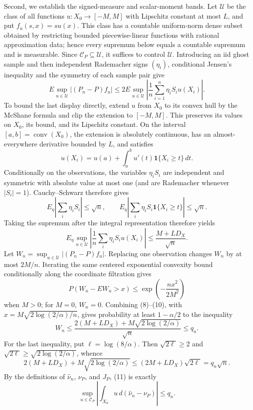 Second, we establish the signed-measure and scalar-moment bands.  Let \(\mathcal U\) be the class of all functions \(u:X_0\to[-M,M]\) with Lipschitz constant at most \(L\), and put \(f_u(s,x)=su(x)\).  This class has a countable uniform-norm dense subset obtained by restricting bounded piecewise-linear functions with rational approximation data; hence every supremum below equals a countable supremum and is measurable.  Since \(\mathcal C_P\subseteq\mathcal U\), it suffices to control \(\mathcal U\).  Introducing an iid ghost sample and then independent Rademacher signs \((\eta_i)\), conditional Jensen's inequality and the symmetry of each sample pair give
\[
 E\sup_{u\in\mathcal U}|(P_n-P)f_u|
 \le 2E\sup_{u\in\mathcal U}
 \left|\frac1n\sum_{i=1}^n\eta_iS_i u(X_i)\right|.                             \tag{8}
\]
To bound the last display directly, extend \(u\) from \(X_0\) to its convex hull by the McShane formula and clip the extension to \([-M,M]\).  This preserves its values on \(X_0\), its bound, and its Lipschitz constant.  On the interval \([a,b]=\operatorname{conv}(X_0)\), the extension is absolutely continuous, has an almost-everywhere derivative bounded by \(L\), and satisfies
\[
 u(X_i)=u(a)+\int_a^b u'(t)\mathbf 1\{X_i\ge t\}\,dt.
\]
Conditionally on the observations, the variables \(\eta_iS_i\) are independent and symmetric with absolute value at most one (and are Rademacher whenever \(|S_i|=1\)).  Cauchy--Schwarz therefore gives
\[
 E_\eta\left|\sum_i\eta_iS_i\right|\le\sqrt n,
 \qquad
 E_\eta\left|\sum_i\eta_iS_i\mathbf 1\{X_i\ge t\}\right|\le\sqrt n.
\]
Taking the supremum after the integral representation therefore yields
\[
 E_\eta\sup_{u\in\mathcal U}
 \left|\frac1n\sum_i\eta_iS_i u(X_i)\right|
 \le \frac{M+LD_X}{\sqrt n}.                                                     \tag{9}
\]
Let \(W_n=\sup_{u\in\mathcal U}|(P_n-P)f_u|\).  Replacing one observation changes \(W_n\) by at most \(2M/n\).  Iterating the same centered exponential convexity bound conditionally along the coordinate filtration gives
\[
 P(W_n-EW_n>x)\le \exp\!\left(-\frac{nx^2}{2M^2}\right)                        \tag{10}
\]
when \(M>0\); for \(M=0\), \(W_n=0\).  Combining (8)--(10), with \(x=M\sqrt{2\log(2/\alpha)/n}\), gives probability at least \(1-\alpha/2\) to the inequality
\[
 W_n\le \frac{2(M+LD_X)+M\sqrt{2\log(2/\alpha)}}{\sqrt n}\le q_n.             \tag{11}
\]
For the last inequality, put \(\ell=\log(8/\alpha)\).  Then \(\sqrt{2\ell}\ge2\) and \(\sqrt{2\ell}\ge\sqrt{2\log(2/\alpha)}\), whence
\[
 2(M+LD_X)+M\sqrt{2\log(2/\alpha)}
 \le (2M+LD_X)\sqrt{2\ell}=q_n\sqrt n.
\]
By the definitions of \(\widehat\nu_n\), \(\nu_P\), and \(J_P\), (11) is exactly
\[
 \sup_{u\in\mathcal C_P}\left|\int_{X_0}u\,d(\widehat\nu_n-\nu_P)\right|
 \le q_n.                                                                         \tag{12}
\]

